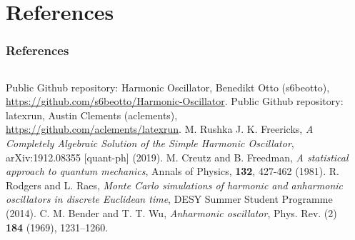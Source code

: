 \documentclass[aspectratio=169]{beamer}
\begin{document}
\section{References}
\begin{frame}
\frametitle{References}
\vspace{-20px}
\begin{columns}[T]
	\begin{column}{0.49\textwidth}
		\begin{tiny}
			\begin{thebibliography}{99}
				\fontsize{6}{6}
				 Public Github repository: Harmonic Oscillator, Benedikt Otto (s6beotto), \\\url{https://github.com/s6beotto/Harmonic-Oscillator}.
				 Public Github repository: latexrun, Austin Clements (aclements), \\\url{https://github.com/aclements/latexrun}.
				 M. Rushka J. K. Freericks, \textit{A Completely Algebraic Solution of the Simple Harmonic Oscillator}, arXiv:1912.08355 [quant-ph] (2019).
				 M. Creutz and B. Freedman, \textit{A statistical approach to quantum mechanics}, Annals of Physics, \textbf{132}, 427-462 (1981).
				 R. Rodgers and L. Raes, \textit{Monte Carlo simulations of harmonic and anharmonic oscillators in discrete Euclidean time}, DESY Summer Student Programme (2014).
				 C. M. Bender and T. T. Wu, \textit{Anharmonic oscillator}, Phys. Rev. (2) \textbf{184} (1969), 1231–1260.
				\setcounter{firstbib}{\value{enumiv}}
			\end{thebibliography}
		\end{tiny}
	\end{column}
	\begin{column}{0.49\textwidth}
		\begin{tiny}
			\begin{thebibliography}{99}
				\fontsize{6}{6}
				\setcounter{enumiv}{\value{firstbib}}
			\end{thebibliography}
		\end{tiny}
	\end{column}
\end{columns}
\end{frame}


\appendixstyle

\appendix
\end{document}
